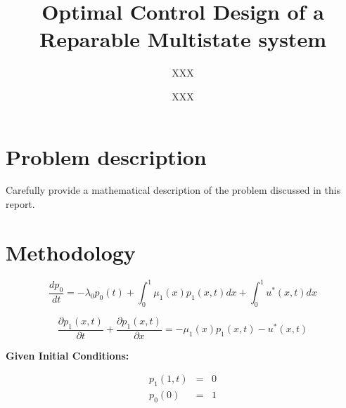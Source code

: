 \documentclass{ifacconf}
\begin{document}
\begin{frontmatter}



\title{
	Optimal Control Design of a Reparable Multistate system}%


\author[First]{XXX} 
\author[Second]{XXX} 


\address[First]{University of Southern California, 
   LA, CA 90089 USA (e-mail: XXX@ usc.edu).}

\address[Second]{University of Southern California, 
   LA, CA 90089 USA (e-mail: XXX@ usc.edu).}

\begin{abstract}                %

\end{abstract}

\begin{keyword}

\end{keyword}

\end{frontmatter}

\section{Problem description}
Carefully provide a mathematical description of the problem discussed in this report. 

\section{Methodology}
\label{sec:method}
\begin{equation}
\label{eq1}
\frac{dp_0}{dt} = -\lambda_0 p_0(t) + \int_0^1 \mu_1(x)p_1(x,t)dx + \int_0^1u^{*}(x,t)dx
\end{equation}

\begin{equation}
\label{eq2}
\frac{\partial p_1(x,t)}{\partial t} + \frac{\partial p_1(x,t)}{\partial x} = -\mu_1(x)p_1(x,t) - u^{*}(x,t)
\end{equation}


\textbf{Given Initial Conditions:}

\begin{eqnarray}
p_1(1,t) &=& 0\\
p_0(0) &=& 1
\end{eqnarray}
\end{document}
